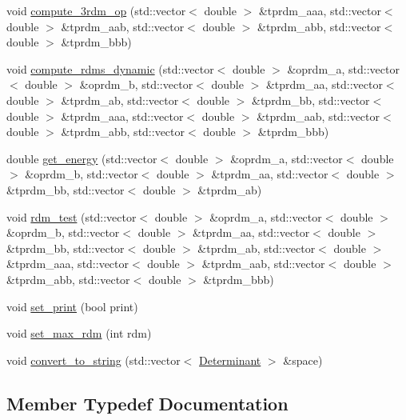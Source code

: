 \begin{DoxyCompactItemize}
\item 
void \mbox{\hyperlink{classforte_1_1_c_i___r_d_m_s_aace0c388b6b00e11261b43360edf3664}{compute\+\_\+3rdm\+\_\+op}} (std\+::vector$<$ double $>$ \&tprdm\+\_\+aaa, std\+::vector$<$ double $>$ \&tprdm\+\_\+aab, std\+::vector$<$ double $>$ \&tprdm\+\_\+abb, std\+::vector$<$ double $>$ \&tprdm\+\_\+bbb)
\item 
void \mbox{\hyperlink{classforte_1_1_c_i___r_d_m_s_abd29572a50f93000b682234ffa832224}{compute\+\_\+rdms\+\_\+dynamic}} (std\+::vector$<$ double $>$ \&oprdm\+\_\+a, std\+::vector$<$ double $>$ \&oprdm\+\_\+b, std\+::vector$<$ double $>$ \&tprdm\+\_\+aa, std\+::vector$<$ double $>$ \&tprdm\+\_\+ab, std\+::vector$<$ double $>$ \&tprdm\+\_\+bb, std\+::vector$<$ double $>$ \&tprdm\+\_\+aaa, std\+::vector$<$ double $>$ \&tprdm\+\_\+aab, std\+::vector$<$ double $>$ \&tprdm\+\_\+abb, std\+::vector$<$ double $>$ \&tprdm\+\_\+bbb)
\item 
double \mbox{\hyperlink{classforte_1_1_c_i___r_d_m_s_a51f0d4ac481cf5579b6557ce5359c646}{get\+\_\+energy}} (std\+::vector$<$ double $>$ \&oprdm\+\_\+a, std\+::vector$<$ double $>$ \&oprdm\+\_\+b, std\+::vector$<$ double $>$ \&tprdm\+\_\+aa, std\+::vector$<$ double $>$ \&tprdm\+\_\+bb, std\+::vector$<$ double $>$ \&tprdm\+\_\+ab)
\item 
void \mbox{\hyperlink{classforte_1_1_c_i___r_d_m_s_a5060c542b3e43206ee7f5ef8e495f906}{rdm\+\_\+test}} (std\+::vector$<$ double $>$ \&oprdm\+\_\+a, std\+::vector$<$ double $>$ \&oprdm\+\_\+b, std\+::vector$<$ double $>$ \&tprdm\+\_\+aa, std\+::vector$<$ double $>$ \&tprdm\+\_\+bb, std\+::vector$<$ double $>$ \&tprdm\+\_\+ab, std\+::vector$<$ double $>$ \&tprdm\+\_\+aaa, std\+::vector$<$ double $>$ \&tprdm\+\_\+aab, std\+::vector$<$ double $>$ \&tprdm\+\_\+abb, std\+::vector$<$ double $>$ \&tprdm\+\_\+bbb)
\item 
void \mbox{\hyperlink{classforte_1_1_c_i___r_d_m_s_aca80a64f8d50eb8784ad27804881938b}{set\+\_\+print}} (bool print)
\item 
void \mbox{\hyperlink{classforte_1_1_c_i___r_d_m_s_ad3d9e1ffe533bbe89b33be83a84da01d}{set\+\_\+max\+\_\+rdm}} (int rdm)
\item 
void \mbox{\hyperlink{classforte_1_1_c_i___r_d_m_s_a88f0699318551cd6012614e06df58b42}{convert\+\_\+to\+\_\+string}} (std\+::vector$<$ \mbox{\hyperlink{namespaceforte_a2076c63fd7b8732004d9e1442ce527c1}{Determinant}} $>$ \&space)
\end{DoxyCompactItemize}


\subsection{Member Typedef Documentation}
\mbox{\label{classforte_1_1_c_i___r_d_m_s_a6fe09e4dcfafed624c05462004a9de51}} 
